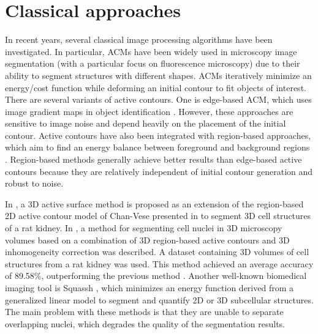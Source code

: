 \section{Classical approaches}
\label{subsection:clas}


In recent years, several classical image processing algorithms have been investigated. In particular, \ac{ACMs} have been widely used in microscopy image segmentation (with a particular focus on fluorescence microscopy) due to their ability to segment structures with different shapes. \ac{ACMs} iteratively minimize an energy/cost function while deforming an initial contour to fit objects of interest. There are several variants of active contours. One is edge-based \ac{ACM}, which uses image gradient maps in object identification \cite{snakes:active}. However, these approaches are sensitive to image noise and depend heavily on the placement of the initial contour. Active contours have also been integrated with region-based approaches, which aim to find an energy balance between foreground and background regions \cite{region:based}. Region-based methods generally achieve better results than edge-based active contours because they are relatively independent of initial contour generation and robust to noise. 


In \cite{3D:active}, a \ac{3D} active surface method is proposed as an extension of the region-based \ac{2D} active contour model of Chan-Vese presented in \cite{region:based} to segment \ac{3D} cell structures of a rat kidney. In \cite{active:inhmo}, a method for segmenting cell nuclei in \ac{3D} microscopy volumes based on a combination of \ac{3D} region-based active contours and \ac{3D} inhomogeneity correction was described. A dataset containing \ac{3D} volumes of cell structures from a rat kidney was used. This method achieved an average accuracy of 89.58\%, outperforming the previous method \cite{region:based}. Another well-known biomedical imaging tool is Squassh \cite{squass:original,squassh}, which minimizes an energy function derived from a generalized linear model to segment and quantify \ac{2D} or \ac{3D} subcellular structures. The main problem with these methods is that they are unable to separate overlapping nuclei, which degrades the quality of the segmentation results. 

